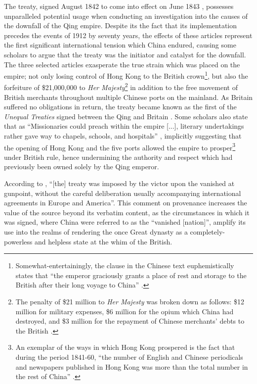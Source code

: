 \documentclass{article}
\begin{document}
The treaty, signed  August 1842 to come into effect on  June 1843
\autocite{Saw:1975}, possesses unparalleled potential usage when conducting an investigation into the causes of the downfall of the Qing empire. Despite its the fact that its implementation precedes the events of 1912 by seventy years, the effects of these articles represent the first significant international tension which China endured, causing some scholars to argue that the treaty was the initiator and catalyst for the downfall. The three selected articles exasperate the true strain which was placed on the empire; not only losing control of Hong Kong to the British crown\footnote{Somewhat-entertainingly, the clause in the Chinese text euphemistically states that ``the emperor graciously grants a place of rest and storage to the British after their long voyage to China''
\autocite{Zhang:2007}.}, but also the forfeiture of \$21,000,000 to \textit{Her Majesty}\footnote{The penalty of \$21 million to \textit{Her Majesty} was broken down as follows: \$12 million for military expenses, \$6 million for the opium which China had destroyed, and \$3 million for the repayment of Chinese merchants' debts to the British
\autocite{Hsu:1999}.} in addition to the free movement of British merchants throughout multiple Chinese ports on the mainland. As Britain suffered no obligations in return, the treaty became known as the first of the \textit{Unequal Treaties} signed between the Qing and Britain
\autocite{Hoe:1999}. Some scholars also state that as ``Missionaries could preach within the empire [...], literary undertakings rather gave way to chapels, schools, and hospitals''
\autocite{Britton:1933}, implicitly suggesting that the opening of Hong Kong and the five ports allowed the empire to prosper\footnote{An exemplar of the ways in which Hong Kong prospered is the fact that during the period 1841-60, ``the number of English and Chinese periodicals and newspapers published in Hong Kong was more than the total number in the rest of China''
\autocite{Huang:2001}.} under British rule, hence undermining the authority and respect which had previously been owned solely by the Qing emperor.

According to
\autocite{Hsu:1999}, ``[the] treaty was imposed by the victor upon the vanished at gunpoint, without the careful deliberation usually accompanying international agreements in Europe and America''. This comment on provenance increases the value of the source beyond its verbatim content, as the circumstances in which it was signed, where China were referred to as the ``vanished [nation]'', amplify its use into the realms of rendering the once Great dynasty as a completely-powerless and helpless state at the whim of the British.
\end{document}
